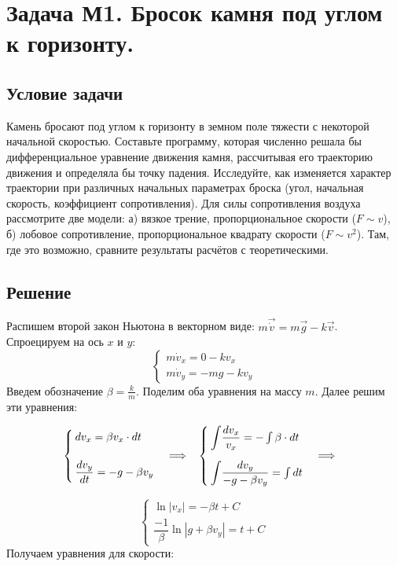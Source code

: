 \section{\textbf{Задача М1}. Бросок камня под углом к горизонту.}
\subsection*{Условие задачи}
Камень бросают под углом к горизонту в земном поле
тяжести с некоторой начальной скоростью. Составьте программу, которая
численно решала бы дифференциальное уравнение движения камня,
рассчитывая его траекторию движения и определяла бы точку падения.
Исследуйте, как изменяется характер траектории при различных начальных
параметрах броска (угол, начальная скорость, коэффициент сопротивления).
Для силы сопротивления воздуха рассмотрите две модели: а) вязкое трение,
пропорциональное скорости ($F \sim v$), б) лобовое сопротивление,
пропорциональное квадрату скорости ($F \sim v^2$). Там, где это возможно,
сравните результаты расчётов с теоретическими.

\subsection*{Решение}
Распишем второй закон Ньютона в векторном виде: $m\vec{\dot{v}} = m\vec{g} - k\vec{v}$. Спроецируем на ось $x$ и $y$:
\[
\begin{cases}
m\dot{v}_x = 0 - kv_x \\[14pt]
m\dot{v}_y = -mg - kv_y
\end{cases}
\]
Введем обозначение $\beta = \frac{k}{m}$. Поделим оба уравнения на массу $m$. Далее решим эти уравнения:

\[
\begin{cases}
dv_x = \beta v_x \cdot dt \\[14pt]
\dfrac{dv_y}{dt} = -g - \beta v_y
\end{cases}
\imply
\begin{cases}
\mathlarger{\int} \dfrac{dv_x}{v_x} = -\int \beta \cdot dt \\[14pt]
\mathlarger{\int} \dfrac{dv_y}{-g - \beta v_y} = \int dt
\end{cases}
\imply
\]

\[
\begin{cases}
\ln{|v_x|} = -\beta t + C \\[14pt]
\dfrac{-1}{\beta} \ln{|g+\beta v_y|} = t + C
\end{cases}
\]
\newpage
\noindent Получаем уравнения для скорости: 

